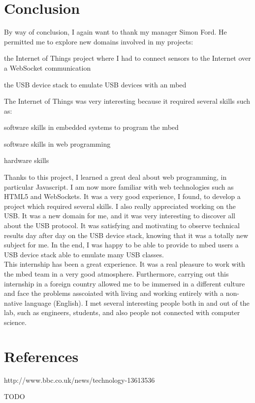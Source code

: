 \documentclass[pdftex,10pt,a4paper]{report}
\newenvironment{packed_item}{
\begin{itemize}
  \setlength{\itemsep}{1pt}
  \setlength{\parskip}{0pt}
  \setlength{\parsep}{0pt}
}{\end{itemize}}
\begin{document}
\chapter{Conclusion}
By way of conclusion, I again want to thank my manager Simon Ford. He permitted me to explore new domains involved in my projects:
\begin{packed_item}
	\item the Internet of Things project where I had to connect sensors to the Internet over a WebSocket communication
	\item the USB device stack to emulate USB devices with an mbed
\end{packed_item}

The Internet of Things was very interesting because it required several skills such as:
\begin{packed_item}
	\item software skills in embedded systems to program the mbed
	\item software skills in web programming
	\item hardware skills
\end{packed_item}


Thanks to this project, I learned a great deal about web programming, in particular Javascript. I am now more familiar with web technologies such as HTML5 and WebSockets. It was a very good experience, I found, to develop a project which required several skills. I also really appreciated working on the USB. It was a new domain for me, and it was very interesting to discover all about the USB protocol. It was satisfying and motivating to observe technical results day after day on the USB device stack, knowing that it was a totally new subject for me. In the end, I was happy to be able to provide to mbed users a USB device stack able to emulate many USB classes. \\


This internship has been a great experience. It was a real pleasure to work with the mbed team in a very good atmosphere. Furthermore, carrying out this
internship in a foreign country allowed me to be immersed in a different culture and face the problems asscoiated with living and working entirely with a non-native language (English). I met several interesting people both in and out of the lab, such as engineers, students, and also people not connected with computer science.




\chapter*{References}
http://www.bbc.co.uk/news/technology-13613536

TODO
\end{document}
